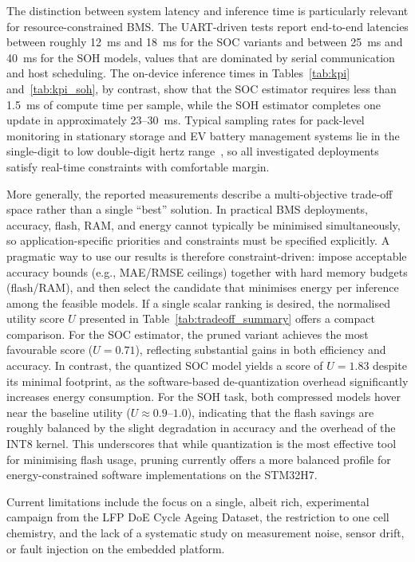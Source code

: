 \documentclass[review]{elsarticle}
\begin{document}
The distinction between system latency and inference time is particularly relevant for resource-constrained BMS. The UART-driven tests report end-to-end latencies between roughly 12~ms and 18~ms for the SOC variants and between 25~ms and 40~ms for the SOH models, values that are dominated by serial communication and host scheduling. The on-device inference times in Tables~\ref{tab:kpi} and~\ref{tab:kpi_soh}, by contrast, show that the SOC estimator requires less than 1.5~ms of compute time per sample, while the SOH estimator completes one update in approximately 23--30~ms. Typical sampling rates for pack-level monitoring in stationary storage and EV battery management systems lie in the single-digit to low double-digit hertz range~\cite{plettBatteryManagementSystems2015,berecibarCriticalReviewState2016}, so all investigated deployments satisfy real-time constraints with comfortable margin.

More generally, the reported measurements describe a multi-objective trade-off space rather than a single ``best'' solution. In practical BMS deployments, accuracy, flash, RAM, and energy cannot typically be minimised simultaneously, so application-specific priorities and constraints must be specified explicitly. A pragmatic way to use our results is therefore constraint-driven: impose acceptable accuracy bounds (e.g., MAE/RMSE ceilings) together with hard memory budgets (flash/RAM), and then select the candidate that minimises energy per inference among the feasible models. If a single scalar ranking is desired, the normalised utility score $U$ presented in Table~\ref{tab:tradeoff_summary} offers a compact comparison. For the SOC estimator, the pruned variant achieves the most favourable score ($U=0.71$), reflecting substantial gains in both efficiency and accuracy. In contrast, the quantized SOC model yields a score of $U=1.83$ despite its minimal footprint, as the software-based de-quantization overhead significantly increases energy consumption. For the SOH task, both compressed models hover near the baseline utility ($U \approx 0.9$--$1.0$), indicating that the flash savings are roughly balanced by the slight degradation in accuracy and the overhead of the INT8 kernel. This underscores that while quantization is the most effective tool for minimising flash usage, pruning currently offers a more balanced profile for energy-constrained software implementations on the STM32H7.

Current limitations include the focus on a single, albeit rich, experimental campaign from the LFP DoE Cycle Ageing Dataset, the restriction to one cell chemistry, and the lack of a systematic study on measurement noise, sensor drift, or fault injection on the embedded platform.
\end{document}
